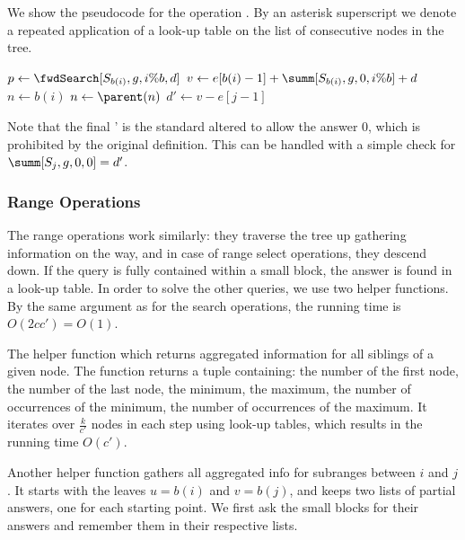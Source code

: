 We show the pseudocode for the operation \fwdSearch{}.
By an asterisk superscript we denote a repeated application of a look-up table on the list of consecutive nodes in the tree.

\begin{algorithmic}
	\State $p \gets \fwdSearch[S_{b(i)}, g, i \% b, d]$
		\State {}
	\Else
		\State $v \gets e[b(i) - 1] + \summ[S_{b(i)}, g, 0, i \% b] + d$
		\State $n \gets b(i)$ 
		 
			\State $n \gets \parent(n)$
				\State {}
			\EndIf
		\EndWhile
			 
		\EndWhile
		\State $d' \gets v - e[j - 1]$ 
		\State {} 
	\EndIf
\EndFunction
\end{algorithmic}

Note that the final \fwdSearch' is the standard \fwdSearch{} altered to allow the answer $0$, which is prohibited by the original definition.
This can be handled with a simple check for $\summ[S_j, g, 0, 0] = d'$.

\subsubsection{Range Operations}

The range operations work similarly: they traverse the tree up gathering information on the way, and in case of range select operations, they descend down.
If the query is fully contained within a small block, the answer is found in a look-up table.
In order to solve the other queries, we use two helper functions.
By the same argument as for the search operations, the running time is $O(2 c c') = O(1)$.

The helper function \rmqInfo{} which returns aggregated information for all siblings of a given node.
The function returns a tuple containing: the number of the first node, the number of the last node, the minimum, the maximum, the number of occurrences of the minimum, the number of occurrences of the maximum.
It iterates over $\frac{k}{c'}$ nodes in each step using look-up tables, which results in the running time $O(c')$.

Another helper function \rmqList{} gathers all aggregated info for subranges between $i$ and $j$.
It starts with the leaves $u = b(i)$ and $v = b(j)$, and keeps two lists of partial answers, one for each starting point.
We first ask the small blocks for their answers and remember them in their respective lists.

